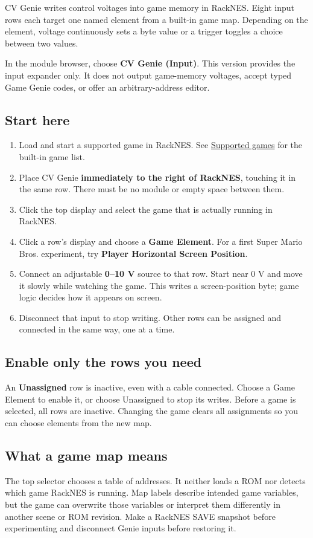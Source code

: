 CV Genie writes control voltages into game memory in RackNES. Eight input
rows each target one named element from a built-in game map. Depending on
the element, voltage continuously sets a byte value or a trigger toggles a
choice between two values.

In the module browser, choose \textbf{CV Genie (Input)}. This version
provides the input expander only. It does not output game-memory voltages,
accept typed Game Genie codes, or offer an arbitrary-address editor.

\subsection{Start here}
\begin{enumerate}
\item Load and start a supported game in RackNES. See
\hyperref[sec:maps]{Supported games} for the built-in game list.
\item Place CV Genie \textbf{immediately to the right of RackNES}, touching
it in the same row. There must be no module or empty space between them.
\item Click the top display and select the game that is actually running
in RackNES.
\item Click a row's display and choose a \textbf{Game Element}. For a first
Super Mario Bros. experiment, try \textbf{Player Horizontal Screen Position}.
\item Connect an adjustable \textbf{0--10 V} source to that row. Start near
0 V and move it slowly while watching the game. This writes a screen-position
byte; game logic decides how it appears on screen.
\item Disconnect that input to stop writing. Other rows can be assigned and
connected in the same way, one at a time.
\end{enumerate}

\subsection{Enable only the rows you need}
An \textbf{Unassigned} row is inactive, even with a cable connected.
Choose a Game Element to enable it, or choose Unassigned to stop its writes.
Before a game is selected, all rows are inactive. Changing the game clears
all assignments so you can choose elements from the new map.

\subsection{What a game map means}
The top selector chooses a table of addresses. It neither loads a ROM nor
detects which game RackNES is running. Map labels describe intended game
variables, but the game can overwrite those variables or interpret them
differently in another scene or ROM revision. Make a RackNES SAVE snapshot
before experimenting and disconnect Genie inputs before restoring it.
